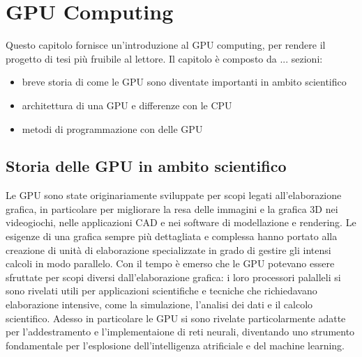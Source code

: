 \chapter{GPU Computing}
\label{sec:gpu}

Questo capitolo fornisce un'introduzione al GPU computing, per rendere il progetto di tesi più fruibile al lettore. Il capitolo è composto da ... sezioni:

\begin{itemize}
    \item breve storia di come le GPU sono diventate importanti in ambito scientifico
    \item architettura di una GPU e differenze con le CPU
    \item metodi di programmazione con delle GPU
\end{itemize}

\section[Breve storia delle GPU in ambito scientifico]{Storia delle GPU in ambito scientifico}

Le GPU sono state originariamente sviluppate per scopi legati all'elaborazione grafica, in particolare per migliorare la resa delle immagini e la grafica 3D nei videogiochi, nelle applicazioni CAD e nei software di modellazione e rendering. Le esigenze di una grafica sempre più dettagliata e complessa hanno portato alla creazione di unità di elaborazione specializzate in grado di gestire gli intensi calcoli in modo parallelo. Con il tempo è emerso che le GPU potevano essere sfruttate per scopi diversi dall'elaborazione grafica: i loro processori palalleli si sono rivelati utili per applicazioni scientifiche e tecniche che richiedavano elaborazione intensive, come la simulazione, l'analisi dei dati e il calcolo scientifico. Adesso in particolare le GPU si sono rivelate particolarmente adatte per l'addestramento e l'implementaione di reti neurali, diventando uno strumento fondamentale per l'esplosione dell'intelligenza atrificiale e del machine learning.


